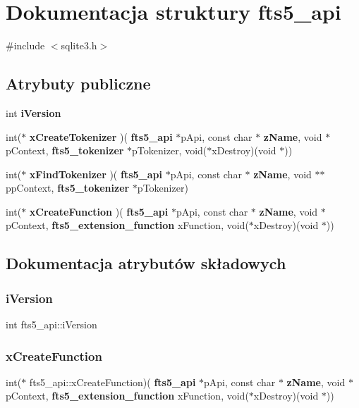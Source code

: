 \section{Dokumentacja struktury fts5\+\_\+api}
\label{structfts5__api}


{\ttfamily \#include $<$sqlite3.\+h$>$}

\subsection*{Atrybuty publiczne}
\begin{DoxyCompactItemize}
\item 
int \textbf{ i\+Version}
\item 
int($\ast$ \textbf{ x\+Create\+Tokenizer} )(\textbf{ fts5\+\_\+api} $\ast$p\+Api, const char $\ast$\textbf{ z\+Name}, void $\ast$p\+Context, \textbf{ fts5\+\_\+tokenizer} $\ast$p\+Tokenizer, void($\ast$x\+Destroy)(void $\ast$))
\item 
int($\ast$ \textbf{ x\+Find\+Tokenizer} )(\textbf{ fts5\+\_\+api} $\ast$p\+Api, const char $\ast$\textbf{ z\+Name}, void $\ast$$\ast$pp\+Context, \textbf{ fts5\+\_\+tokenizer} $\ast$p\+Tokenizer)
\item 
int($\ast$ \textbf{ x\+Create\+Function} )(\textbf{ fts5\+\_\+api} $\ast$p\+Api, const char $\ast$\textbf{ z\+Name}, void $\ast$p\+Context, \textbf{ fts5\+\_\+extension\+\_\+function} x\+Function, void($\ast$x\+Destroy)(void $\ast$))
\end{DoxyCompactItemize}


\subsection{Dokumentacja atrybutów składowych}
\mbox{\label{structfts5__api_a3c338289abb33e1805da870172956a7c}} 
\subsubsection{iVersion}
{\footnotesize\ttfamily int fts5\+\_\+api\+::i\+Version}

\mbox{\label{structfts5__api_aa932ba45865c10b49592920b9610db93}} 
\subsubsection{xCreateFunction}
{\footnotesize\ttfamily int($\ast$ fts5\+\_\+api\+::x\+Create\+Function)(\textbf{ fts5\+\_\+api} $\ast$p\+Api, const char $\ast$\textbf{ z\+Name}, void $\ast$p\+Context, \textbf{ fts5\+\_\+extension\+\_\+function} x\+Function, void($\ast$x\+Destroy)(void $\ast$))}

